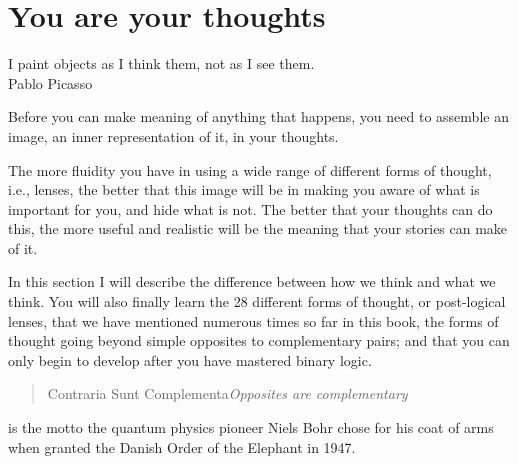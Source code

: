 \chapter{You are your thoughts}
\label{chapter:who-am-i-sense}


\begin{chapterquotation}
I paint objects as I think them, not as I see them. \\
\raggedleft\textemdash Pablo Picasso
\end{chapterquotation}




Before you can make meaning of anything that happens, you need to assemble an image, an inner representation of it, in your thoughts. 


The more fluidity you have in using a wide range of different forms of thought, i.e., lenses, the better that this image will be in making you aware of what is important for you, and hide what is not. The better that your thoughts can do this, the more useful and realistic will be the meaning that your stories can make of it.


In this section I will describe the difference between how we think and what we think. You will also finally learn the 28 different forms of thought, or post-logical lenses, that we have mentioned numerous times so far in this book, the forms of thought going beyond simple opposites to complementary pairs; and that you can only begin to develop after you have mastered binary logic.


\begin{quote} 
Contraria Sunt Complementa\textemdash \emph{Opposites are complementary}
\end{quote} 


is the motto the quantum physics pioneer Niels Bohr chose for his coat of arms when granted the Danish Order of the Elephant in 1947. 


